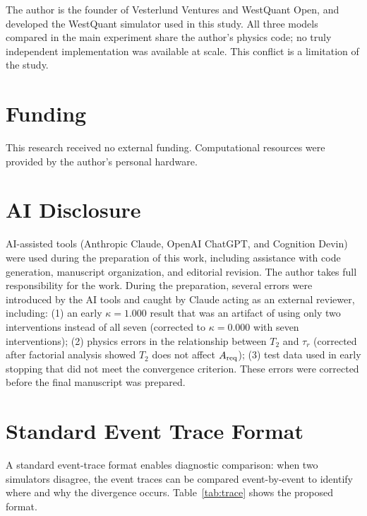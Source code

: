 \documentclass[aps,prapplied,reprint,superscriptaddress]{revtex4-2}
\begin{document}
The author is the founder of Vesterlund Ventures and WestQuant Open, and developed the WestQuant simulator used in this study. All three models compared in the main experiment share the author's physics code; no truly independent implementation was available at scale. This conflict is a limitation of the study.

\section*{Funding}

This research received no external funding. Computational resources were provided by the author's personal hardware.

\section*{AI Disclosure}

AI-assisted tools (Anthropic Claude, OpenAI ChatGPT, and Cognition Devin) were used during the preparation of this work, including assistance with code generation, manuscript organization, and editorial revision. The author takes full responsibility for the work. During the preparation, several errors were introduced by the AI tools and caught by Claude acting as an external reviewer, including: (1) an early $\kappa = 1.000$ result that was an artifact of using only two interventions instead of all seven (corrected to $\kappa = 0.000$ with seven interventions); (2) physics errors in the relationship between $T_2$ and $\tau_r$ (corrected after factorial analysis showed $T_2$ does not affect $A_{\rm req}$); (3) test data used in early stopping that did not meet the convergence criterion. These errors were corrected before the final manuscript was prepared.

\appendix

\section{Standard Event Trace Format}
\label{app:trace}

A standard event-trace format enables diagnostic comparison: when two simulators disagree, the event traces can be compared event-by-event to identify where and why the divergence occurs. Table~\ref{tab:trace} shows the proposed format.
\end{document}
